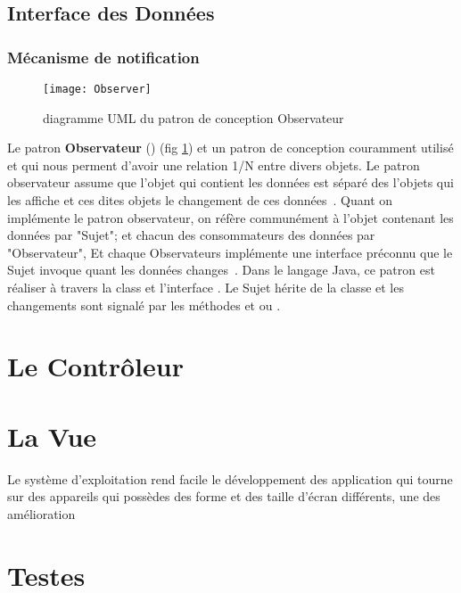 \subsection{Interface des Données}
\subsubsection{Mécanisme de notification}

\begin{figure}[H]
\center
\texttt{[image: Observer]}
\caption{diagramme UML du patron de conception Observateur~\cite{wiki:observer}}
\label{fig:observer}
\end{figure}

Le patron \textbf{Observateur} () (fig \ref{fig:observer}) et un patron de conception couramment utilisé et qui nous perment d'avoir une relation 1/N entre divers objets.
Le patron observateur assume que l'objet qui contient les données est séparé des l'objets qui les affiche et ces dites objets  le changement de ces données~\cite{jdp-observer}.
Quant on implémente le patron observateur, on réfère communément à l'objet contenant les données par "Sujet"; et chacun des consommateurs des données par "Observateur", Et chaque Observateurs implémente une interface préconnu que le Sujet invoque quant les données changes~\cite{jdp-observer}.
Dans le langage Java, ce patron est réaliser à travers la class  et l'interface . Le Sujet hérite de la classe  et les changements sont signalé par les méthodes  et  ou .


\section{Le Contrôleur}

\section{La Vue}
Le système d'exploitation \android rend facile le développement des application qui tourne sur des appareils qui possèdes des forme et des taille d’écran différents, une des amélioration

\section{Testes}


